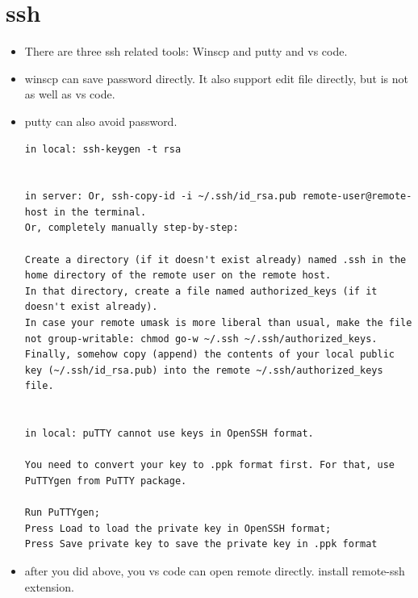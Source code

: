 \documentclass[a4paper,11pt,twoside]{book}
\begin{document}
\section{ssh}

\begin{itemize}
	\item There are three ssh related tools: Winscp and putty and vs code. 
	
	\item winscp can save password directly. It also support edit file directly, but is not as well as vs code. 
	
	\item putty can also avoid password. 
\begin{verbatim}
in local: ssh-keygen -t rsa 


in server: Or, ssh-copy-id -i ~/.ssh/id_rsa.pub remote-user@remote-host in the terminal. 
Or, completely manually step-by-step:

Create a directory (if it doesn't exist already) named .ssh in the home directory of the remote user on the remote host.
In that directory, create a file named authorized_keys (if it doesn't exist already).
In case your remote umask is more liberal than usual, make the file not group-writable: chmod go-w ~/.ssh ~/.ssh/authorized_keys.
Finally, somehow copy (append) the contents of your local public key (~/.ssh/id_rsa.pub) into the remote ~/.ssh/authorized_keys file.


in local: puTTY cannot use keys in OpenSSH format.

You need to convert your key to .ppk format first. For that, use PuTTYgen from PuTTY package.

Run PuTTYgen;
Press Load to load the private key in OpenSSH format;
Press Save private key to save the private key in .ppk format
\end{verbatim}

	\item after you did above, you vs code can open remote directly.  install remote-ssh extension. 
	
\end{itemize}
\end{document}
